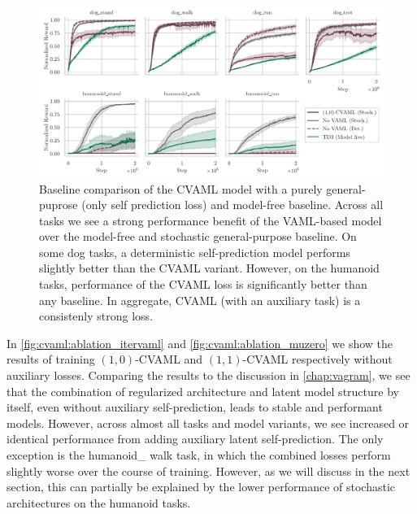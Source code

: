 \label{sec:cvaml:empirical_arch}
\begin{figure}[t]
\centering
    \includegraphics[width=\textwidth]{figures/lambda/plts/ablated_reward1.pdf}
    \caption{Baseline comparison of the CVAML model with a purely general-puprose (only self prediction loss) and model-free baseline. Across all tasks we see a strong performance benefit of the VAML-based model over the model-free and stochastic general-purpose baseline. On some dog tasks, a deterministic self-prediction model performs slightly better than the CVAML variant. However, on the humanoid tasks, performance of the CVAML loss is significantly better than any baseline. In aggregate, CVAML (with an auxiliary task) is a consistenly strong loss.}
    \label{fig:cvaml:mf_baseline}
\end{figure}

In \autoref{fig:cvaml:ablation_itervaml} and \autoref{fig:cvaml:ablation_muzero} we show the results of training $(1,0)$-CVAML and $(1,1)$-CVAML respectively without auxiliary losses.
Comparing the results to the discussion in \autoref{chap:vagram}, we see that the combination of regularized architecture and latent model structure by itself, even without auxiliary self-prediction, leads to stable and performant models.
However, across almost all tasks and model variants, we see increased or identical performance from adding auxiliary latent self-prediction.
The only exception is the humanoid\_ walk task, in which the combined losses perform slightly worse over the course of training.
However, as we will discuss in the next section, this can partially be explained by the lower performance of stochastic architectures on the humanoid tasks.

